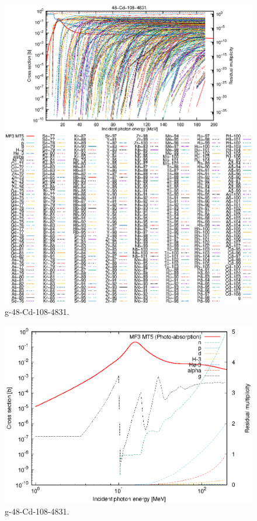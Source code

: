\begin{figure}
 \includegraphics[width=\linewidth]{eps/g_48-Cd-108_4831.eps}
  \caption{g-48-Cd-108-4831.}
\end{figure}
\newpage \clearpage

\begin{figure}
 \includegraphics[width=\linewidth]{eps-log/g_48-Cd-108_4831.eps}
 \caption{g-48-Cd-108-4831.}
\end{figure}
\newpage \clearpage

